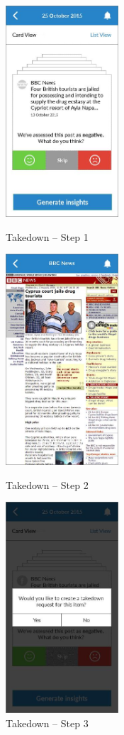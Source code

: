 \begin{figure}
  \subfigures
  \centering
  \begin{minipage}{4.6cm}
    \centering
    \includegraphics[width=4.2cm]{inc/ui_takedown_step1.jpg}
    \caption{Takedown -- Step 1}
    \label{fig:ui_takedown_step1}
  \end{minipage}
  \begin{minipage}{4.6cm}
    \centering
    \includegraphics[width=4.2cm]{inc/ui_takedown_step2.jpg}
    \caption{Takedown -- Step 2}
    \label{fig:ui_takedown_step2}
  \end{minipage}
  \begin{minipage}{4.6cm}
    \centering
    \includegraphics[width=4.2cm]{inc/ui_takedown_step3.jpg}
    \caption{Takedown -- Step 3}
    \label{fig:ui_takedown_step3}
  \end{minipage}
\end{figure}

